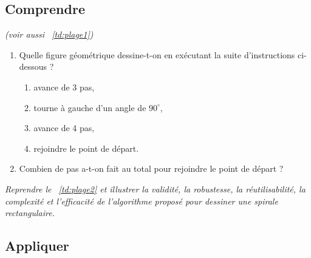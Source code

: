 \subsection{Comprendre}
\begin{td}\label{td:plage3}
\em
(voir aussi \tdir\ \ref{td:plage1})
\begin{enumerate}
\item Quelle figure géométrique dessine-t-on en exécutant la suite d'instructions 
ci-dessous ?
	\begin{enumerate}
	\item avance de 3 pas,
	\item tourne à gauche d'un angle de $90^\circ$,
	\item avance de 4 pas,
	\item rejoindre le point de départ.
	\end{enumerate}
\item Combien de pas a-t-on fait au total pour rejoindre le point de départ ?
\end{enumerate}
\end{td}

\begin{td}\label{td:plage4}
\em
Reprendre le \tdir\ \ref{td:plage2} et illustrer la validité, la robustesse, 
la réutilisabilité, la complexité et l'efficacité de
l'algorithme proposé pour dessiner une spirale rectangulaire.
\end{td}


\subsection{Appliquer}


